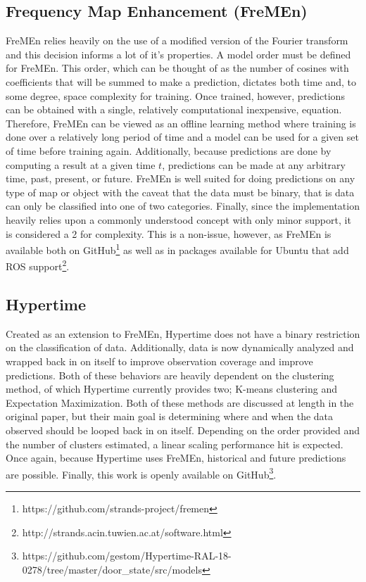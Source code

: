   \subsection { Frequency Map Enhancement (FreMEn) \cite{Krajnik2015}}
  FreMEn relies heavily on the use of a modified version of the Fourier
  transform and this decision informs a lot of it's properties. A model order must
  be defined for FreMEn. This order, which can be thought of as the number of
  cosines with coefficients that will be summed to make a prediction, dictates
  both time and, to some degree, space complexity for training. Once trained,
  however, predictions can be obtained with a single, relatively computational
  inexpensive, equation. Therefore, FreMEn can be
  viewed as an offline learning method where training is done over a relatively
  long period of time and a model can be used for a given set of time before
  training again. Additionally, because predictions are done by computing a
  result at a given time $t$, predictions can be made at any arbitrary time,
  past, present, or future. FreMEn is well suited for doing predictions on any type
  of map or object with the caveat that the data must be binary, that is
  data can only be classified into one of two categories. Finally, since the
  implementation heavily relies upon a commonly understood concept with only
  minor support, it is considered a 2 for complexity. This is a non-issue,
  however, as FreMEn is available both on
  GitHub\footnote[1]{https://github.com/strands-project/fremen}
  as well as in packages available for Ubuntu that add ROS
  support\footnote[2]{http://strands.acin.tuwien.ac.at/software.html}.


  \subsection { Hypertime \cite{Krajnik2018}}

  Created as an extension to FreMEn, Hypertime does not have a binary restriction
  on the classification of data. Additionally, data is now dynamically analyzed
  and wrapped back in on itself to improve observation coverage and improve
  predictions. Both of these behaviors are heavily dependent on the clustering
  method, of which Hypertime currently provides two; K-means clustering and
  Expectation Maximization. Both of these methods are discussed at length in
  the original paper, but their main goal is determining where and when the data observed
  should be looped back in on itself. Depending on the order provided and the
  number of clusters estimated, a linear scaling performance hit is expected.
  Once again, because Hypertime uses FreMEn, historical and future predictions
  are possible. Finally, this work is openly available on GitHub\footnote[3]{https://github.com/gestom/Hypertime-RAL-18-0278/tree/master/door\_state/src/models}.

